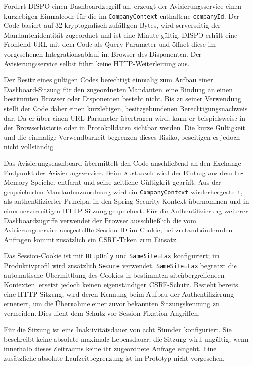 \documentclass[
  12pt,
  a4paper,
  oneside
]{article}
\begin{document}
Fordert DISPO einen Dashboardzugriff an, erzeugt der Avisierungsservice einen
kurzlebigen Einmalcode für die im \texttt{CompanyContext} enthaltene
\texttt{companyId}. Der Code basiert auf 32 kryptografisch zufälligen Bytes,
wird serverseitig der Mandantenidentität zugeordnet und ist eine Minute gültig.
DISPO erhält eine Frontend-URL mit dem Code als Query-Parameter und öffnet diese
im vorgesehenen Integrationsablauf im Browser des Disponenten. Der
Avisierungsservice selbst führt keine HTTP-Weiterleitung aus.

Der Besitz eines gültigen Codes berechtigt einmalig zum Aufbau einer
Dashboard-Sitzung für den zugeordneten Mandanten; eine Bindung an einen
bestimmten Browser oder Disponenten besteht nicht. Bis zu seiner Verwendung
stellt der Code daher einen kurzlebigen, besitzgebundenen Berechtigungsnachweis
dar. Da er über einen URL-Parameter übertragen wird, kann er beispielsweise in
der Browserhistorie oder in Protokolldaten sichtbar werden. Die kurze Gültigkeit
und die einmalige Verwendbarkeit begrenzen dieses Risiko, beseitigen es jedoch
nicht vollständig.

Das Avisierungsdashboard übermittelt den Code anschließend an den
Exchange-Endpunkt des Avisierungsservice. Beim Austausch wird der Eintrag aus
dem In-Memory-Speicher entfernt und seine zeitliche Gültigkeit geprüft. Aus der
gespeicherten Mandantenzuordnung wird ein \texttt{CompanyContext}
wiederhergestellt, als
authentifizierter Principal in den Spring-Security-Kontext übernommen und in
einer serverseitigen HTTP-Sitzung gespeichert. Für die Authentifizierung
weiterer Dashboardzugriffe verwendet der Browser ausschließlich die vom
Avisierungsservice ausgestellte Session-ID im Cookie; bei zustandsändernden
Anfragen kommt zusätzlich ein CSRF-Token zum Einsatz.

Das Session-Cookie ist mit \texttt{HttpOnly} und \texttt{SameSite=Lax}
konfiguriert; im Produktivprofil wird zusätzlich \texttt{Secure} verwendet.
\texttt{SameSite=Lax} begrenzt die automatische Übermittlung des Cookies in
bestimmten siteübergreifenden Kontexten, ersetzt jedoch keinen eigenständigen
CSRF-Schutz. Besteht bereits eine HTTP-Sitzung, wird deren Kennung beim Aufbau
der Authentifizierung erneuert, um die Übernahme einer zuvor bekannten
Sitzungskennung zu vermeiden. Dies dient dem Schutz vor
Session-Fixation-Angriffen.

Für die Sitzung ist eine Inaktivitätsdauer von acht Stunden konfiguriert. Sie
beschreibt keine absolute maximale Lebensdauer; die Sitzung wird ungültig, wenn
innerhalb dieses Zeitraums keine ihr zugeordnete Anfrage eingeht. Eine
zusätzliche absolute Laufzeitbegrenzung ist im Prototyp nicht vorgesehen.
\end{document}
